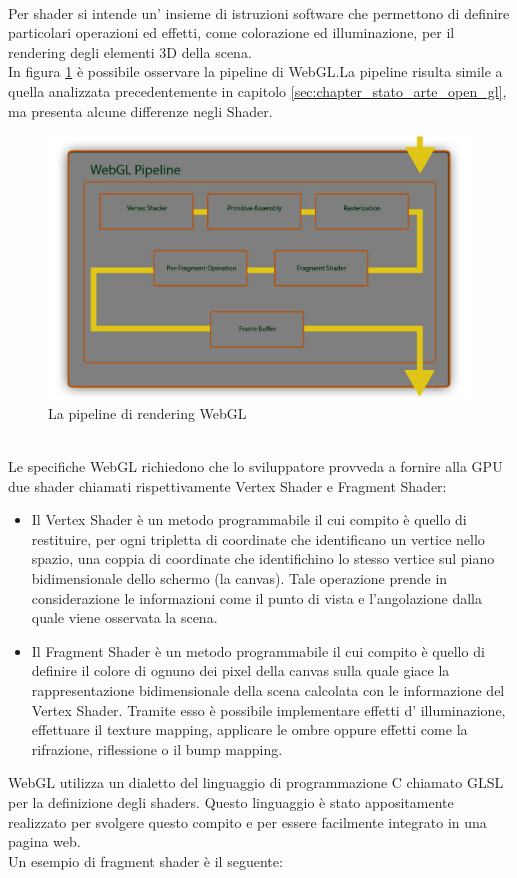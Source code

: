 \\
Per shader si intende un’ insieme di istruzioni software che permettono di definire particolari operazioni ed effetti, come colorazione ed illuminazione, per il rendering degli elementi 3D della scena.
\\
In figura \ref{fig:tecnologie_abilitanti_webglrender}  è possibile osservare la pipeline di WebGL.La pipeline risulta simile a quella analizzata precedentemente in capitolo \ref{sec:chapter_stato_arte_open_gl}, ma presenta alcune differenze negli Shader.
\\
\begin{figure}[htb]
 \centering
 \includegraphics[width=0.9\linewidth]{images/chapter_tecnologie_abilitanti/tecnologie_abilitanti_webglrender.png}\hfill
 \caption[La pipeline di WebGL]{La pipeline di rendering WebGL}
 \label{fig:tecnologie_abilitanti_webglrender}
\end{figure}
\\
Le specifiche WebGL richiedono che lo sviluppatore provveda a fornire alla GPU due shader chiamati rispettivamente Vertex Shader e Fragment Shader: \cite{webgl8}
\begin{itemize}
\item Il Vertex Shader è un metodo programmabile il cui compito è quello di restituire, per ogni tripletta di coordinate che identificano un vertice nello spazio, una coppia di coordinate che identifichino lo stesso vertice sul piano bidimensionale dello schermo (la canvas). Tale operazione prende in considerazione le informazioni come il punto di vista e l’angolazione dalla quale viene osservata la scena.
\item Il Fragment Shader è un metodo programmabile il cui compito è quello di definire il colore di ognuno dei pixel della canvas sulla quale giace la rappresentazione bidimensionale della scena calcolata con le informazione del Vertex Shader. Tramite esso è possibile implementare effetti d’ illuminazione, effettuare il texture mapping, applicare le ombre oppure effetti come la rifrazione, riflessione o il bump mapping.
\end{itemize}
WebGL utilizza un dialetto del linguaggio di programmazione C chiamato GLSL per la definizione degli shaders. Questo linguaggio è stato appositamente realizzato per svolgere questo compito e per essere facilmente integrato in una pagina web.
\\
Un esempio di fragment shader è il seguente: \cite{webgl7}


